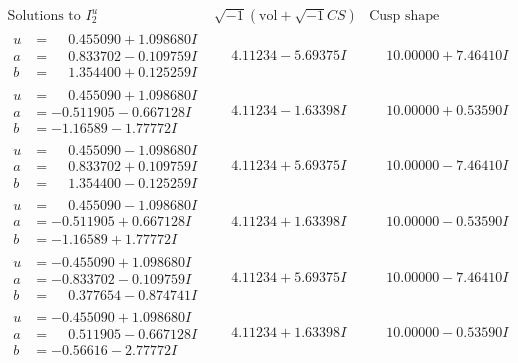 \documentclass[1p]{elsarticle_modified}
\theoremstyle{definition}
\newcommand{\I}{\sqrt{-1}}
\begin{document}
$$\begin{array}{c|c|c}  
\text{Solutions to }I^u_{2}& \I (\text{vol} + \sqrt{-1}CS) & \text{Cusp shape}\\
 \hline 
\begin{aligned}
u &= \phantom{-}0.455090 + 1.098680 I \\
a &= \phantom{-}0.833702 - 0.109759 I \\
b &= \phantom{-}1.354400 + 0.125259 I\end{aligned}
 & \phantom{-}4.11234 - 5.69375 I & \phantom{-}10.00000 + 7.46410 I \\ \hline\begin{aligned}
u &= \phantom{-}0.455090 + 1.098680 I \\
a &= -0.511905 - 0.667128 I \\
b &= -1.16589 - 1.77772 I\end{aligned}
 & \phantom{-}4.11234 - 1.63398 I & \phantom{-}10.00000 + 0.53590 I \\ \hline\begin{aligned}
u &= \phantom{-}0.455090 - 1.098680 I \\
a &= \phantom{-}0.833702 + 0.109759 I \\
b &= \phantom{-}1.354400 - 0.125259 I\end{aligned}
 & \phantom{-}4.11234 + 5.69375 I & \phantom{-}10.00000 - 7.46410 I \\ \hline\begin{aligned}
u &= \phantom{-}0.455090 - 1.098680 I \\
a &= -0.511905 + 0.667128 I \\
b &= -1.16589 + 1.77772 I\end{aligned}
 & \phantom{-}4.11234 + 1.63398 I & \phantom{-}10.00000 - 0.53590 I \\ \hline\begin{aligned}
u &= -0.455090 + 1.098680 I \\
a &= -0.833702 - 0.109759 I \\
b &= \phantom{-}0.377654 - 0.874741 I\end{aligned}
 & \phantom{-}4.11234 + 5.69375 I & \phantom{-}10.00000 - 7.46410 I \\ \hline\begin{aligned}
u &= -0.455090 + 1.098680 I \\
a &= \phantom{-}0.511905 - 0.667128 I \\
b &= -0.56616 - 2.77772 I\end{aligned}
 & \phantom{-}4.11234 + 1.63398 I & \phantom{-}10.00000 - 0.53590 I \\ \hline\begin{aligned}

\end{aligned}
\end{array}$$
\end{document}
